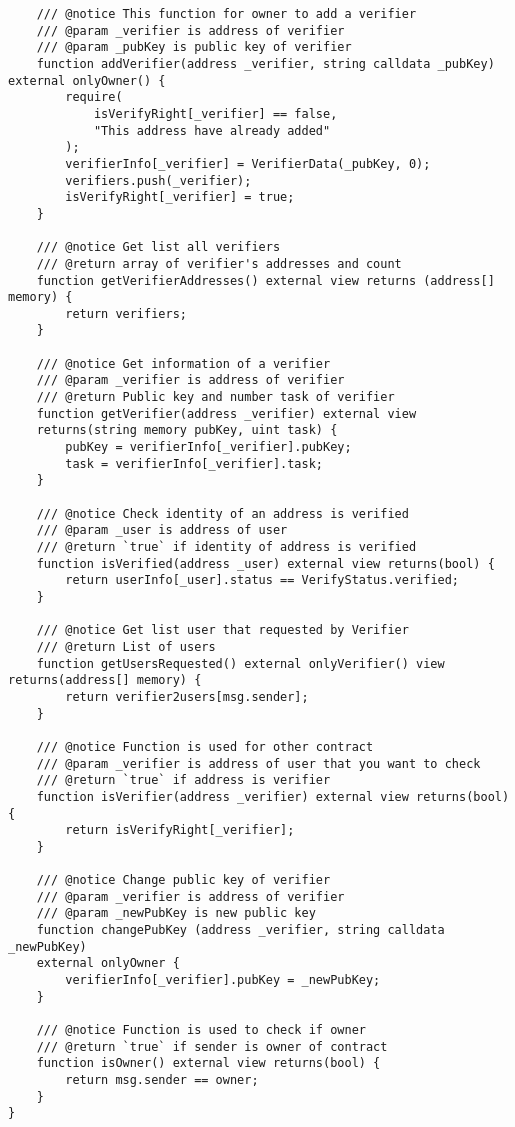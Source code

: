 \documentclass[../main-report.tex]{subfiles}
\begin{document}
\begin{lstlisting}
    /// @notice This function for owner to add a verifier
    /// @param _verifier is address of verifier
    /// @param _pubKey is public key of verifier
    function addVerifier(address _verifier, string calldata _pubKey) external onlyOwner() {
        require(
            isVerifyRight[_verifier] == false,
            "This address have already added"
        );
        verifierInfo[_verifier] = VerifierData(_pubKey, 0);
        verifiers.push(_verifier);
        isVerifyRight[_verifier] = true;
    }

    /// @notice Get list all verifiers
    /// @return array of verifier's addresses and count
    function getVerifierAddresses() external view returns (address[] memory) {
        return verifiers;
    }

    /// @notice Get information of a verifier
    /// @param _verifier is address of verifier
    /// @return Public key and number task of verifier
    function getVerifier(address _verifier) external view
    returns(string memory pubKey, uint task) {
        pubKey = verifierInfo[_verifier].pubKey;
        task = verifierInfo[_verifier].task;
    }

    /// @notice Check identity of an address is verified
    /// @param _user is address of user
    /// @return `true` if identity of address is verified
    function isVerified(address _user) external view returns(bool) {
        return userInfo[_user].status == VerifyStatus.verified;
    }

    /// @notice Get list user that requested by Verifier
    /// @return List of users
    function getUsersRequested() external onlyVerifier() view returns(address[] memory) {
        return verifier2users[msg.sender];
    }

    /// @notice Function is used for other contract
    /// @param _verifier is address of user that you want to check
    /// @return `true` if address is verifier
    function isVerifier(address _verifier) external view returns(bool) {
        return isVerifyRight[_verifier];
    }

    /// @notice Change public key of verifier
    /// @param _verifier is address of verifier
    /// @param _newPubKey is new public key
    function changePubKey (address _verifier, string calldata _newPubKey)
    external onlyOwner {
        verifierInfo[_verifier].pubKey = _newPubKey;
    }

    /// @notice Function is used to check if owner
    /// @return `true` if sender is owner of contract
    function isOwner() external view returns(bool) {
        return msg.sender == owner;
    }
}
\end{lstlisting}
\end{document}
